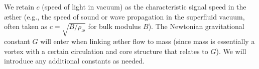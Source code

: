 We retain $c$ (speed of light in vacuum) as the characteristic signal speed in the æther (e.g., the speed of sound or wave propagation in the superfluid vacuum, often taken as $c = \sqrt{B/\rho_{\text{\ae}}}$ for bulk modulus $B$). The Newtonian gravitational constant $G$ will enter when linking æther flow to mass (since mass is essentially a vortex with a certain circulation and core structure that relates to $G$). We will introduce any additional constants as needed.
